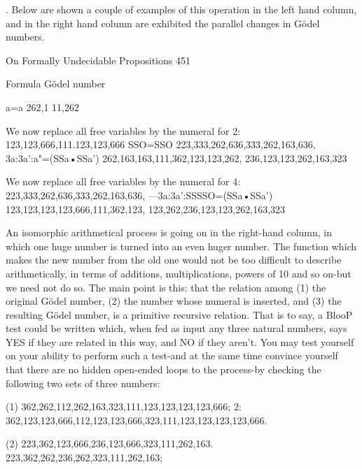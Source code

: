 . Below are shown a couple of examples of this operation in the left hand column, and in
the right hand column are exhibited the parallel changes in Gödel numbers.




On Formally Undecidable Propositions                                                     451

       Formula                                          Gödel number

       a=a                                              262,1 11,262

We now replace all
free variables by
the numeral for 2:
                                                 123,123,666,111.123,123,666
SSO=SSO
                                                 223,333,262,636,333,262,163,636,
3a:3a':a"=(SSa•SSa')
                                                 262,163,163,111,362,123,123,262,
                                                 236,123,123,262,163,323

We now replace all
 free variables by
the numeral for 4:
                                                 223,333,262,636,333,262,163,636,
---3a:3a':SSSSO=(SSa•SSa')                       123,123,123,123,666,111,362,123,
                                                 123,262,236,123,123,262,163,323

         An isomorphic arithmetical process is going on in the right-hand column, in
which one huge number is turned into an even huger number. The function which makes
the new number from the old one would not be too difficult to describe arithmetically, in
terms of additions, multiplications, powers of 10 and so on-but we need not do so. The
main point is this: that the relation among (1) the original Gödel number, (2) the number
whose numeral is inserted, and (3) the resulting Gödel number, is a primitive recursive
relation. That is to say, a BlooP test could be written which, when fed as input any three
natural numbers, says YES if they are related in this way, and NO if they aren't. You may
test yourself on your ability to perform such a test-and at the same time convince yourself
that there are no hidden open-ended loops to the process-by checking the following two
sets of three numbers:

(1)    362,262,112,262,163,323,111,123,123,123,123,666;
       2:
       362,123,123,666,112,123,123,666,323,111,123,123,123,123,666.

(2)    223,362,123,666,236,123,666,323,111,262,163.
       223,362,262,236,262,323,111,262,163;

